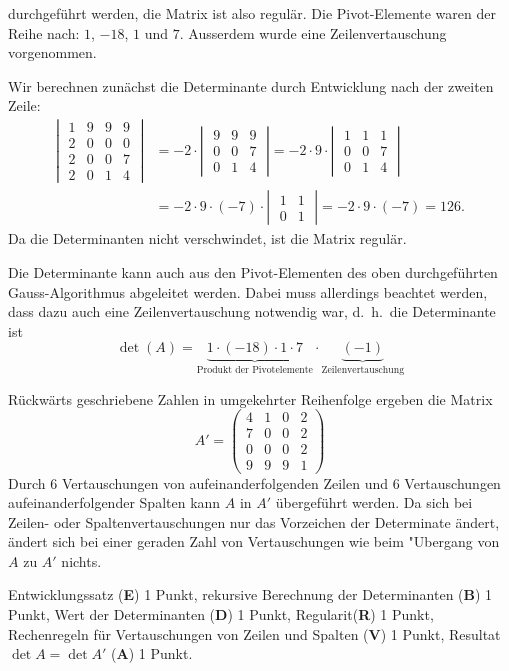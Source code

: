 \begin{loesung}
\begin{teilaufgaben}
durchgeführt werden, die Matrix ist also regulär. Die Pivot-Elemente
waren der Reihe nach: $1$, $-18$, $1$ und $7$.
Ausserdem wurde eine Zeilenvertauschung vorgenommen.
\item
Wir berechnen zunächst die Determinante durch Entwicklung
nach der zweiten Zeile:
\begin{align*}
\left|\;
\begin{matrix}
1&9&9&9\\
2&0&0&0\\
2&0&0&7\\
2&0&1&4
\end{matrix}
\;\right|
&=
-2\cdot
\left|\;\begin{matrix}
9&9&9\\
0&0&7\\
0&1&4
\end{matrix}\;\right|
=-2\cdot 9\cdot
\left|\;\begin{matrix}
1&1&1\\
0&0&7\\
0&1&4
\end{matrix}\;\right|
\\
&=
-2\cdot 9\cdot(-7)\cdot
\left|\;\begin{matrix}
1&1\\
0&1
\end{matrix}\;\right|
=
-2\cdot 9\cdot(-7)=126.
\end{align*}
Da die Determinanten nicht verschwindet, ist die Matrix regulär.

Die Determinante kann auch aus den Pivot-Elementen des oben durchgeführten
Gauss-Algorithmus abgeleitet werden. Dabei muss allerdings beachtet werden,
dass dazu auch eine Zeilenvertauschung notwendig war, d.~h.~die Determinante
ist 
\[
\det(A)=\underbrace{1\cdot (-18)\cdot 1\cdot 7}_{\text{Produkt der Pivotelemente}}\cdot \underbrace{(-1)}_{\text{Zeilenvertauschung}}
\]
\item Rückwärts geschriebene Zahlen in umgekehrter Reihenfolge 
ergeben die Matrix
\[
A'=\begin{pmatrix}
4&1&0&2\\
7&0&0&2\\
0&0&0&2\\
9&9&9&1
\end{pmatrix}
\]
Durch 6 Vertauschungen von aufeinanderfolgenden Zeilen und 6
Vertauschungen aufeinanderfolgender Spalten kann $A$ in $A'$
übergeführt werden. Da sich bei Zeilen- oder Spaltenvertauschungen
nur das Vorzeichen der Determinate ändert, ändert sich bei
einer geraden Zahl von Vertauschungen wie beim "Ubergang von $A$
zu $A'$ nichts.
\qedhere
\end{teilaufgaben}
\end{loesung}

\begin{bewertung}
Entwicklungssatz ({\bf E}) 1 Punkt,
rekursive Berechnung der Determinanten ({\bf B}) 1 Punkt,
Wert der Determinanten ({\bf D}) 1 Punkt,
Regularit ({\bf R}) 1 Punkt, 
Rechenregeln für Vertauschungen von Zeilen und Spalten ({\bf V}) 1 Punkt,
Resultat $\det A=\det A'$ ({\bf A}) 1 Punkt.
\end{bewertung}




